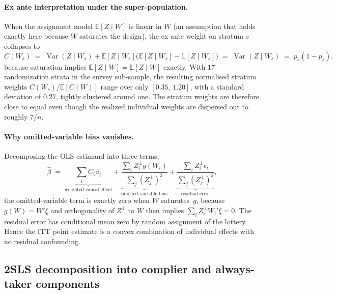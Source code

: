 \documentclass[11pt]{article}
\newcommand{\E}{\mathbb{E}}
\newcommand{\Var}{\operatorname{Var}}
\newcommand{\Lproj}{\mathbb{L}}
\begin{document}
\paragraph{Ex ante interpretation under the super-population.}
When the assignment model $\E[Z\mid W]$ is linear in $W$ (an assumption
that holds exactly here because $W$ saturates the design), the ex ante
weight on stratum $s$ collapses to
\[
    C(W_{s}) \;=\; \Var(Z\mid W_{s})
              + \E[Z\mid W_{s}]\big(\E[Z\mid W_{s}]
                                       - \Lproj[Z\mid W_{s}]\big)
              \;=\; \Var(Z\mid W_{s})
              \;=\; p_{s}(1-p_{s}),
\]
because saturation implies $\E[Z\mid W]=\Lproj[Z\mid W]$ exactly.
With $17$ randomization strata in the survey sub-sample, the resulting
normalised stratum weights $C(W_{s})/\E[C(W)]$ range over only
$[0.35,\,1.20]$, with a standard deviation of $0.27$, tightly
clustered around one. The stratum weights are therefore close to equal
even though the realized individual weights are dispersed out to
roughly $7/n$.

\paragraph{Why omitted-variable bias vanishes.}
Decomposing the OLS estimand into three terms,
\begin{equation}\label{eq:ovb}
\hat\beta \;=\;
   \underbrace{\sum_{i} C_{i}\beta_{i}}_{\text{weighted causal effect}}
 + \underbrace{\frac{\sum_{i} Z_{i}^{\perp} g(W_{i})}
                    {\sum_{j} (Z_{j}^{\perp})^{2}}}_{\text{omitted-variable bias}}
 + \underbrace{\frac{\sum_{i} Z_{i}^{\perp} \epsilon_{i}}
                    {\sum_{j} (Z_{j}^{\perp})^{2}}}_{\text{residual error}},
\end{equation}
the omitted-variable term is exactly zero when $W$ saturates~$g$,
because $g(W)=W'\xi$ and orthogonality of $Z^{\perp}$ to $W$ then
implies $\sum_{i} Z_{i}^{\perp} W_{i}'\xi = 0$. The residual error has
conditional mean zero by random assignment of the lottery. Hence the
ITT point estimate is a convex combination of individual effects with
no residual confounding.

\subsection{2SLS decomposition into complier and always-taker components}
\end{document}
